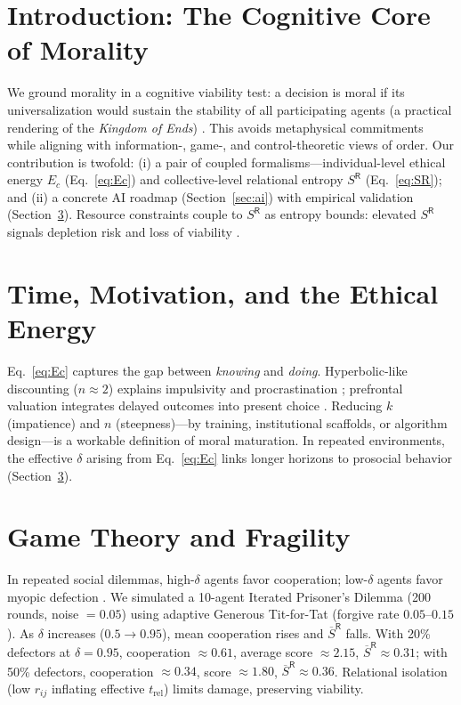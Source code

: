 \documentclass[11pt]{article}
\newcommand{\SR}{S^{\mathsf{R}}}
\newcommand{\SRbar}{\overline{S}^{\mathsf{R}}}
\begin{document}
\section{Introduction: The Cognitive Core of Morality}
We ground morality in a cognitive viability test: a decision is moral if its universalization would sustain the stability of all participating agents (a practical rendering of the \emph{Kingdom of Ends}) \citep{Kant1785,Rawls1971,Parfit1984}. This avoids metaphysical commitments while aligning with information-, game-, and control-theoretic views of order. Our contribution is twofold: (i) a pair of coupled formalisms---individual-level ethical energy $E_c$ (Eq.~\ref{eq:Ec}) and collective-level relational entropy $\SR$ (Eq.~\ref{eq:SR}); and (ii) a concrete AI roadmap (Section~\ref{sec:ai}) with empirical validation (Section~\ref{sec:ipd}). Resource constraints couple to $\SR$ as entropy bounds: elevated $\SR$ signals depletion risk and loss of viability \citep{England2013}.

\section{Time, Motivation, and the Ethical Energy}
\label{sec:time}
Eq.~\ref{eq:Ec} captures the gap between \emph{knowing} and \emph{doing}. Hyperbolic-like discounting ($n\!\approx\!2$) explains impulsivity and procrastination \citep{Ainslie1975,Frederick2002}; prefrontal valuation integrates delayed outcomes into present choice \citep{KableGlimcher2007,Mischel1989}. Reducing $k$ (impatience) and $n$ (steepness)---by training, institutional scaffolds, or algorithm design---is a workable definition of moral maturation. In repeated environments, the effective $\delta$ arising from Eq.~\ref{eq:Ec} links longer horizons to prosocial behavior (Section~\ref{sec:ipd}).

\section{Game Theory and Fragility}
\label{sec:ipd}
In repeated social dilemmas, high-$\delta$ agents favor cooperation; low-$\delta$ agents favor myopic defection \citep{Axelrod1984,Nowak2006,MaynardSmith1982}. We simulated a 10-agent Iterated Prisoner’s Dilemma (200 rounds, noise $=0.05$) using adaptive Generous Tit-for-Tat (forgive rate $0.05$–$0.15$). As $\delta$ increases ($0.5\!\to\!0.95$), mean cooperation rises and $\SRbar$ falls. With 20\% defectors at $\delta\!=\!0.95$, cooperation $\approx 0.61$, average score $\approx 2.15$, $\SRbar\!\approx\!0.31$; with 50\% defectors, cooperation $\approx 0.34$, score $\approx 1.80$, $\SRbar\!\approx\!0.36$. Relational isolation (low $r_{ij}$ inflating effective $t_{\mathrm{rel}}$) limits damage, preserving viability.
\end{document}
